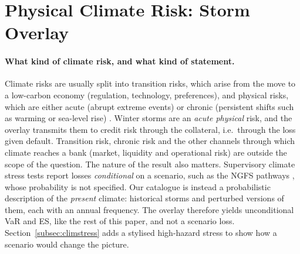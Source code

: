 \section{Physical Climate Risk: Storm Overlay}
\label{sec:climate}

\paragraph{What kind of climate risk, and what kind of statement.}
Climate risks are usually split into transition risks, which arise from the move to a low-carbon economy (regulation, technology, preferences), and physical risks, which are either acute (abrupt extreme events) or chronic (persistent shifts such as warming or sea-level rise) \citep{Acharya23}. Winter storms are an \emph{acute physical} risk, and the overlay transmits them to credit risk through the collateral, i.e.\ through the loss given default. Transition risk, chronic risk and the other channels through which climate reaches a bank (market, liquidity and operational risk) are outside the scope of the question. The nature of the result also matters. Supervisory climate stress tests report losses \emph{conditional} on a scenario, such as the NGFS pathways \citep{NGFS24}, whose probability is not specified. Our catalogue is instead a probabilistic description of the \emph{present} climate: historical storms and perturbed versions of them, each with an annual frequency. The overlay therefore yields unconditional VaR and ES, like the rest of this paper, and not a scenario loss. Section~\ref{subsec:climstress} adds a stylised high-hazard stress to show how a scenario would change the picture.

